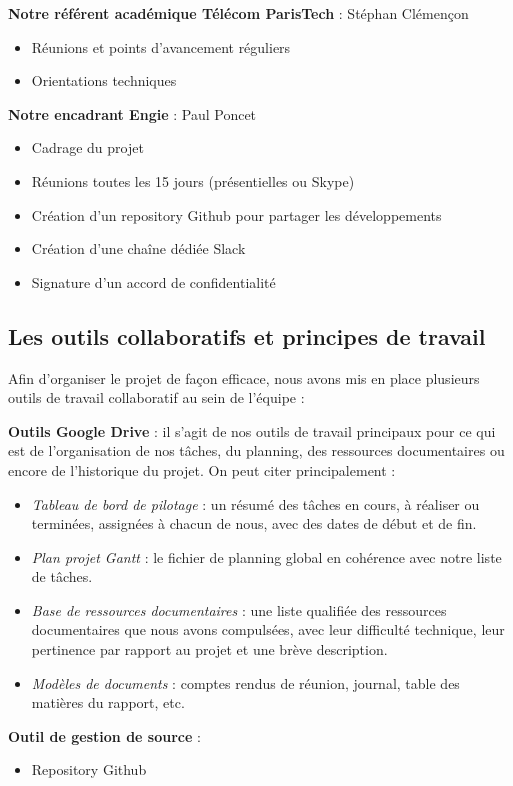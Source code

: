 \textbf{Notre référent académique Télécom ParisTech} : Stéphan Clémençon
\begin{itemize}
\item Réunions et points d'avancement réguliers
\item Orientations techniques
\end{itemize}

\textbf{Notre encadrant Engie} :  Paul Poncet
\begin{itemize}
\item Cadrage du projet
\item Réunions toutes les 15 jours (présentielles ou Skype)
\item Création d’un repository Github pour partager les développements
\item Création d’une chaîne dédiée Slack
\item Signature d’un accord de confidentialité
\end{itemize}

\subsection{Les outils collaboratifs et principes de travail}
Afin d'organiser le projet de façon efficace, nous avons mis en place plusieurs outils de travail collaboratif au sein de l'équipe :

\textbf{Outils Google Drive} : il s'agit de nos outils de travail principaux pour ce qui est de l'organisation de nos tâches, du planning, des ressources documentaires ou encore de l'historique du projet. On peut citer principalement :
\begin{itemize}
\item \emph{Tableau de bord de pilotage} : un résumé des tâches en cours, à réaliser ou terminées, assignées à chacun de nous, avec des dates de début et de fin.
\item \emph{Plan projet Gantt} : le fichier de planning global en cohérence avec notre liste de tâches.
\item \emph{Base de ressources documentaires} : une liste qualifiée des ressources documentaires que nous avons compulsées, avec leur difficulté technique, leur pertinence par rapport au projet et une brève description.
\item \emph{Modèles de documents} : comptes rendus de réunion, journal, table des matières du rapport, etc.
\end{itemize}

\textbf{Outil de gestion de source} :
\begin{itemize}
\item Repository Github
\end{itemize}

